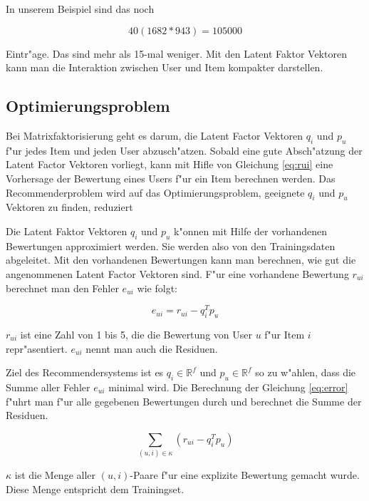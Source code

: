 \documentclass[a4paper, 12pt]{article}
\begin{document}
In unserem Beispiel sind das noch

\begin{equation}
  \label{eq:dimred}
  40(1682*943) = 105000
\end{equation}

Eintr"age. Das sind mehr als 15-mal weniger. Mit den Latent Faktor Vektoren kann man die Interaktion zwischen User und Item kompakter darstellen.

\subsection{Optimierungsproblem}
\label{sec:optim}

Bei Matrixfaktorisierung geht es darum, die Latent Factor Vektoren $q_i$ und $p_u$ f"ur jedes Item und jeden User abzusch"atzen. Sobald eine gute Absch"atzung der Latent Factor Vektoren vorliegt, kann mit Hifle von Gleichung \ref{eq:rui} eine Vorhersage der Bewertung eines Users f"ur ein Item berechnen werden. Das Recommenderproblem wird auf das Optimierungsproblem, geeignete  $q_i$ und $p_u$ Vektoren zu finden, reduziert

Die Latent Faktor Vektoren $q_i$ und $p_u$ k"onnen mit Hilfe der vorhandenen Bewertungen approximiert werden. Sie werden also von den Trainingsdaten abgeleitet. Mit den vorhandenen Bewertungen kann man berechnen, wie gut die angenommenen Latent Factor Vektoren sind. F"ur eine vorhandene Bewertung $r_{ui}$ berechnet man den Fehler $e_{ui}$ wie folgt:

\begin{equation}
  \label{eq:error}
  e_{ui} = r_{ui} - q_i^T p_u
\end{equation}

$r_{ui}$ ist eine Zahl von 1 bis 5, die die Bewertung von User $u$ f"ur Item $i$ repr"asentiert. $e_{ui}$ nennt man auch die Residuen.

Ziel des Recommendersystems ist es $q_i \in \mathbb{R}^f$ und $p_u \in \mathbb{R}^f$ so zu w"ahlen, dass die Summe aller Fehler $e_{ui}$ minimal wird. Die Berechnung der Gleichung \ref{eq:error} f"uhrt man f"ur alle gegebenen Bewertungen durch und berechnet die Summe der Residuen.

\begin{equation}
\label{eq:errorsum}
  \sum_{(u,i) \in \kappa} (r_{ui} - q_i^T p_u)
\end{equation}

$\kappa$ ist die Menge aller $(u,i)$-Paare f"ur eine explizite Bewertung gemacht wurde. Diese Menge entspricht dem Trainingset.
\end{document}

